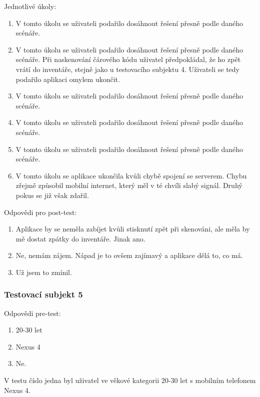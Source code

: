 \documentclass[thesis=B,czech]{FITthesis}[2013/10/20]
\begin{document}
Jednotlivé úkoly:
\begin{enumerate}
  \item V tomto úkolu se uživateli podařilo dosáhnout řešení přesně podle daného scénáře.
  \item V tomto úkolu se uživateli podařilo dosáhnout řešení přesně podle daného scénáře. Při naskenování čárového kódu uživatel předpokládal, že ho zpět vrátí do inventáře, stejně jako u testovacího subjektu 4. Uživateli se tedy podařilo aplikaci omylem ukončit.
  \item V tomto úkolu se uživateli podařilo dosáhnout řešení přesně podle daného scénáře.
  \item V tomto úkolu se uživateli podařilo dosáhnout řešení přesně podle daného scénáře.
  \item V tomto úkolu se uživateli podařilo dosáhnout řešení přesně podle daného scénáře.
  \item V tomto úkolu se aplikace ukončila kvůli chybě spojení se serverem. Chybu zřejmě způsobil mobilní internet, který měl v té chvíli slabý signál. Druhý pokus se již však zdařil.
\end{enumerate}

Odpovědi pro post-test:
\begin{enumerate}
  \item Aplikace by se neměla zabíjet kvůli stisknutí zpět při skenováni, ale měla by mě dostat zpátky do inventáře. Jinak ano.
  \item Ne, nemám zájem. Nápad je to ovšem zajímavý a aplikace dělá to, co má.
  \item Už jsem to zmínil.
\end{enumerate}

\subsubsection{Testovací subjekt 5}

Odpovědi pre-test:

\begin{enumerate}
  \item 20-30 let
  \item Nexus 4
  \item Ne.
\end{enumerate}

V testu číslo jedna byl uživatel ve věkové kategorii 20-30 let s mobilním telefonem Nexus 4.
\end{document}
